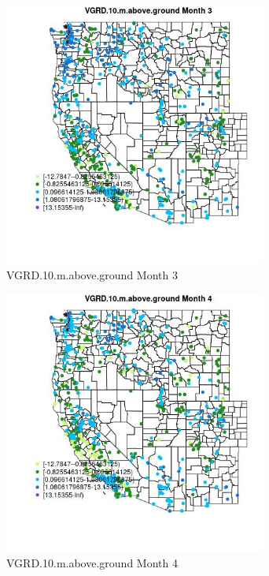 \begin{figure} 
\centering  
\includegraphics[width=0.77\textwidth]{Code_Outputs/Report_ML_input_PM25_Step4_part_e_de_duplicated_aves_compiled_2019-05-21wNAs_MapObsMo3VGRD10maboveground.jpg} 
\caption{\label{fig:Report_ML_input_PM25_Step4_part_e_de_duplicated_aves_compiled_2019-05-21wNAsMapObsMo3VGRD10maboveground}VGRD.10.m.above.ground Month 3} 
\end{figure} 
 

\begin{figure} 
\centering  
\includegraphics[width=0.77\textwidth]{Code_Outputs/Report_ML_input_PM25_Step4_part_e_de_duplicated_aves_compiled_2019-05-21wNAs_MapObsMo4VGRD10maboveground.jpg} 
\caption{\label{fig:Report_ML_input_PM25_Step4_part_e_de_duplicated_aves_compiled_2019-05-21wNAsMapObsMo4VGRD10maboveground}VGRD.10.m.above.ground Month 4} 
\end{figure} 
 

